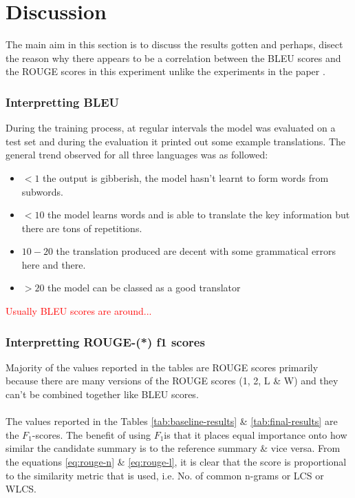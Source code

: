 \documentclass[12pt,a4paper,twoside,openright]{report}
\newcommand{\red}[1]{\textcolor{red}{#1}}
\newcommand{\fone}{$F_1$}
\begin{document}
\section{Discussion}
\label{discussion}
The main aim in this section is to discuss the results gotten and perhaps, disect the reason why there appears to be a correlation between the BLEU scores and the ROUGE scores in this experiment unlike the experiments in the paper \cite{nguyen-daume-iii-2019-global}.

\subsubsection{Interpretting BLEU}
During the training process, at regular intervals the model was evaluated on a test set and during the evaluation it printed out some example translations. The general trend observed for all three languages was as followed:
\begin{itemize}
    \item $<1$ the output is gibberish, the model hasn't learnt to form words from subwords.
    \item $<10$ the model learns words and is able to translate the key information but there are tons of repetitions.
    \item $10-20$ the translation produced are decent with some grammatical errors here and there.
    \item $>20$ the model can be classed as a good translator
\end{itemize}

\red{Usually BLEU scores are around...}

\subsubsection{Interpretting ROUGE-(*) f1 scores}
Majority of the values reported in the tables are ROUGE scores primarily because there are many versions of the ROUGE scores (1, 2, L \& W) and they can't be combined together like BLEU scores.
\\\\
The values reported in the Tables \ref{tab:baseline-results} \& \ref{tab:final-results} are the \fone-scores. The benefit of using \fone  is that it places equal importance onto how similar the candidate summary is to the reference summary \& vice versa. From the equations \ref{eq:rouge-n} \& \ref{eq:rouge-l}, it is clear that the score is proportional to the similarity metric that is used, i.e. No. of common n-grams or LCS or WLCS.
\end{document}
